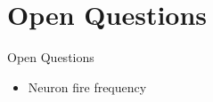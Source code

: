 \section{Open Questions}


\begin{frame}[c]{Open Questions}
    \begin{itemize}
        \item Neuron fire frequency
    \end{itemize}
\end{frame}


